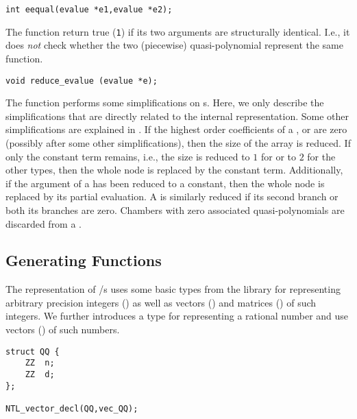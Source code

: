 \begin{verbatim}
int eequal(evalue *e1,evalue *e2);
\end{verbatim}
The function  return true (\verb+1+) if its
two arguments are structurally identical.
I.e., it does {\em not\/} check whether the two
(piecewise) quasi-polynomial represent the same function.

\begin{verbatim}
void reduce_evalue (evalue *e);
\end{verbatim}
The function  performs some
simplifications on s.
Here, we only describe the simplifications that are directly
related to the internal representation.
Some other simplifications are explained in
.
If the highest order coefficients of a ,
 or  are zero (possibly
after some other simplifications), then the size of the array
is reduced.  If only the constant term remains, i.e.,
the size is reduced to $1$ for   or to $2$
for the other types, then the whole node is replaced by
the constant term.
Additionally, if the argument of a 
has been reduced to a constant, then the whole node
is replaced by its partial evaluation.
A  is similarly reduced if its second
branch or both its branches are zero.
Chambers with zero associated quasi-polynomials are
discarded from a .

\subsection{Generating Functions}

The representation of \rgf/s uses 
some basic types from the  library 
for representing arbitrary precision integers
() 
as well as vectors () and matrices ()
of such integers.
We further introduces a type  for representing a rational
number and use vectors () of such numbers.
\begin{verbatim}
struct QQ {
    ZZ	n;
    ZZ	d;
};

NTL_vector_decl(QQ,vec_QQ);
\end{verbatim}

